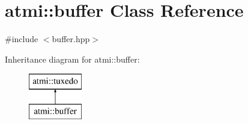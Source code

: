 \hypertarget{classatmi_1_1buffer}{}\section{atmi\+:\+:buffer Class Reference}
\label{classatmi_1_1buffer}


{\ttfamily \#include $<$buffer.\+hpp$>$}

Inheritance diagram for atmi\+:\+:buffer\+:\begin{figure}[H]
\begin{center}
\leavevmode
\includegraphics[height=2.000000cm]{classatmi_1_1buffer}
\end{center}
\end{figure}
